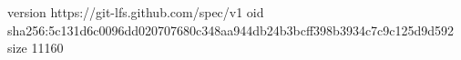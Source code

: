 version https://git-lfs.github.com/spec/v1
oid sha256:5c131d6c0096dd020707680c348aa944db24b3bcff398b3934c7c9c125d9d592
size 11160
